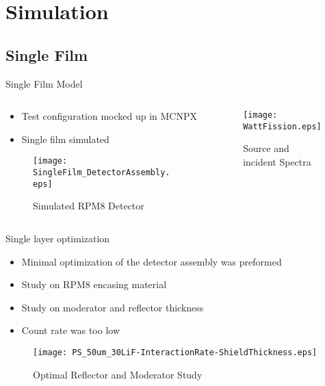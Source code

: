 
% 
%
\section{Simulation}

\subsection{Single Film}
\begin{frame}{Single Film Model}
\begin{columns}[onlytextwidth]
\begin{column}{0.45\textwidth}
\begin{itemize}
	\item Test configuration mocked up in MCNPX
	\item Single film simulated
\end{itemize}
	\tiny
	\begin{figure}
		\centering
		\texttt{[image: SingleFilm\_DetectorAssembly.eps]}
		\caption{Simulated RPM8 Detector}
	\end{figure}
\end{column}
\begin{column}{0.45\textwidth}
	\tiny
	\begin{figure}
		\centering
		\texttt{[image: WattFission.eps]}
		\caption{Source and incident Spectra}
	\end{figure}
\end{column}
\end{columns}
\end{frame}
\begin{frame}{Single layer optimization}
	\tiny
	\begin{itemize}
		\item Minimal optimization of the detector assembly was preformed
		\item Study on RPM8 encasing material
		\item Study on moderator and reflector thickness
		\item Count rate was too low
	\end{itemize}
	\begin{figure}
		\centering
		\texttt{[image: PS\_50um\_30LiF-InteractionRate-ShieldThickness.eps]}
		\tiny \caption{Optimal Reflector and Moderator Study}
	\end{figure}
\end{frame}
